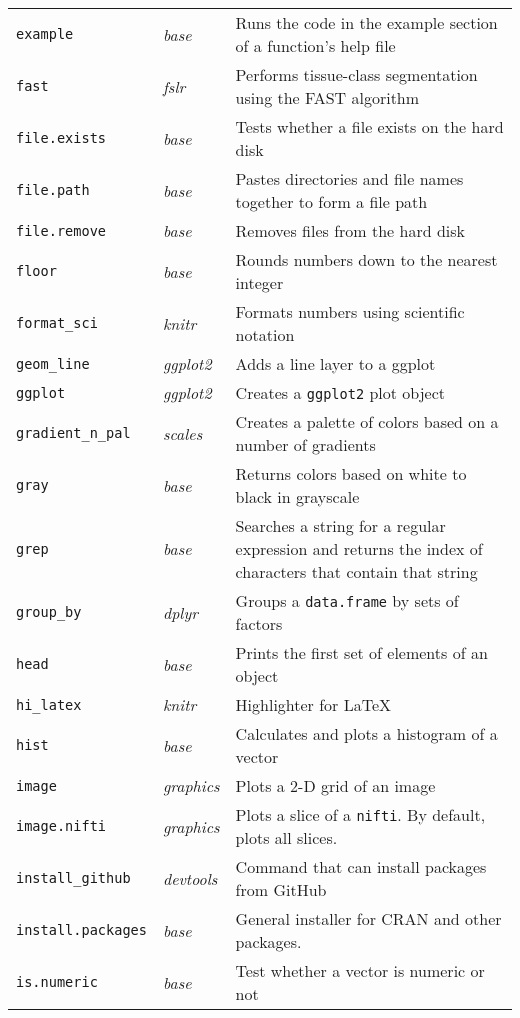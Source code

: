 \documentclass[10pt,landscape]{article}
\newcommand{\code}[1]{\texttt{#1}}
\newcommand{\pkg}[1]{\emph{#1}}
\begin{document}
\begin{tabular}{lll}
\code{example} & \pkg{base} & Runs the code in the example section of a function's help file \\
\code{fast} & \pkg{fslr} & Performs tissue-class segmentation using the FAST algorithm \\
\code{file.exists} & \pkg{base} & Tests whether a file exists on the hard disk \\
\code{file.path} & \pkg{base} & Pastes directories and file names together to form a file path \\
\code{file.remove} & \pkg{base} & Removes files from the hard disk \\
\code{floor} & \pkg{base} & Rounds numbers down to the nearest integer \\
\code{format\_sci} & \pkg{knitr} & Formats numbers using scientific notation \\
\code{geom\_line} & \pkg{ggplot2} & Adds a line layer to a ggplot \\
\code{ggplot} & \pkg{ggplot2} & Creates a \code{ggplot2} plot object \\
\code{gradient\_n\_pal} & \pkg{scales} & Creates a palette of colors based on a number of gradients \\
\code{gray} & \pkg{base} & Returns colors based on white to black in grayscale \\
\code{grep} & \pkg{base} & Searches a string for a regular expression and returns the index of characters that contain that string  \\
\code{group\_by} & \pkg{dplyr} & Groups a \code{data.frame} by sets of factors \\
\code{head} & \pkg{base} & Prints the first set of elements of an object\\
\code{hi\_latex} & \pkg{knitr} & Highlighter for LaTeX\\
\code{hist} & \pkg{base} & Calculates and plots a histogram of a vector\\
\code{image} & \pkg{graphics} & Plots a 2-D grid of an image\\
\code{image.nifti} & \pkg{graphics} & Plots a slice of a \code{nifti}.  By default, plots all slices. \\
\code{install\_github} & \pkg{devtools} & Command that can install packages from GitHub \\
\code{install.packages} & \pkg{base} & General installer for CRAN and other packages. \\
\code{is.numeric} & \pkg{base} & Test whether a vector is numeric or not\\

\end{tabular}
\end{document}
